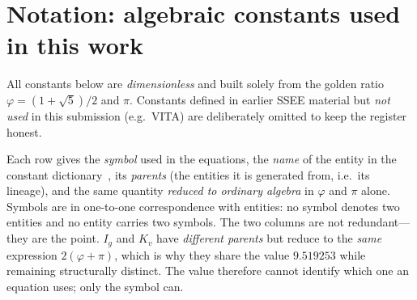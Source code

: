 \documentclass[aps,prd,preprint,amsmath,amssymb,nofootinbib,longbibliography]{revtex4-2}
\begin{document}
\maketitle

{\small
 \begingroup
 \let\oldaddvspace\addvspace
 \renewcommand{\addvspace}[1]{\oldaddvspace{2.5pt}}%
 \setlength{\parskip}{0pt}%
 \tableofcontents
 \endgroup}





\section*{Notation: algebraic constants used in this work}
\label{sec:notation}

All constants below are \emph{dimensionless} and built solely from the golden
ratio $\varphi=(1+\sqrt5)/2$ and $\pi$. Constants defined in earlier SSEE
material but \emph{not used} in this submission (e.g.\ VITA) are deliberately
omitted to keep the register honest.

Each row gives the \emph{symbol} used in the equations, the \emph{name} of the
entity in the constant dictionary~\citep{AlmeidaSSEE2026genesis}, its
\emph{parents} (the entities it is generated from, i.e.\ its lineage), and the
same quantity \emph{reduced to ordinary algebra} in $\varphi$ and $\pi$ alone.
Symbols are in one-to-one correspondence with entities: no symbol denotes two
entities and no entity carries two symbols. The two columns are not redundant---
they are the point. $I_g$ and $K_v$ have \emph{different parents} but reduce to
the \emph{same} expression $2(\varphi+\pi)$, which is why they share the value
$9.519253$ while remaining structurally distinct. The value therefore cannot
identify which one an equation uses; only the symbol can.
\end{document}
